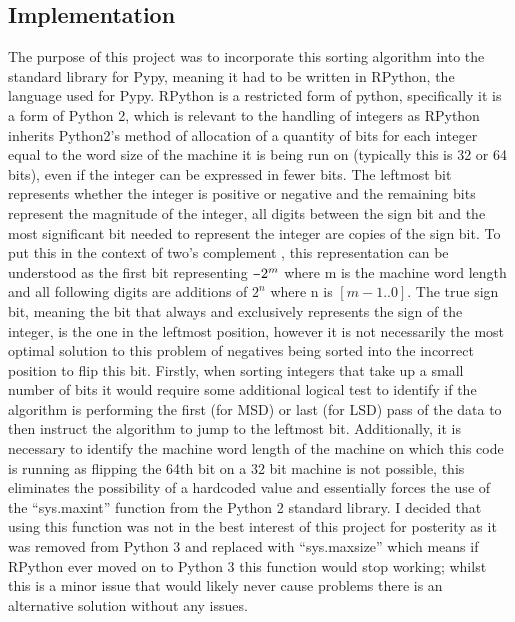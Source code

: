 \documentclass[12pt]{article}
\newcommand{\minus}{\scalebox{0.75}[1.0]{$-$}}
\begin{document}
	\subsection{Implementation}
	The purpose of this project was to incorporate this sorting algorithm into the standard library for Pypy, meaning it had to be written in RPython, the language used for Pypy. RPython is a restricted form of python, specifically it is a form of Python 2, which is relevant to the handling of integers as RPython inherits Python2’s method of allocation of a quantity of bits for each integer equal to the word size of the machine it is being run on (typically this is 32 or 64 bits), even if the integer can be expressed in fewer bits. The leftmost bit represents whether the integer is positive or negative and the remaining bits represent the magnitude of the integer, all digits between the sign bit and the most significant bit needed to represent the integer are copies of the sign bit. To put this in the context of two’s complement , this representation can be understood as the first bit representing $\minus2^{m}$ where m is the machine word length and all following digits are additions of $2^{n}$ where n is $[m-1..0]$.
	\newline
	\newline
	The true sign bit, meaning the bit that always and exclusively represents the sign of the integer, is the one in the leftmost position, however it is not necessarily the most optimal solution to this problem of negatives being sorted into the incorrect position to flip this bit. Firstly, when sorting integers that take up a small number of bits it would require some additional logical test to identify if the algorithm is performing the first (for MSD) or last (for LSD) pass of the data to then instruct the algorithm to jump to the leftmost bit. Additionally, it is necessary to identify the machine word length of the machine on which this code is running as flipping the 64th bit on a 32 bit machine is not possible, this eliminates the possibility of a hardcoded value and essentially forces the use of the “sys.maxint” function from the Python 2 standard library. I decided that using this function was not in the best interest of this project for posterity as it was removed from Python 3 and replaced with “sys.maxsize” which means if RPython ever moved on to Python 3 this function would stop working; whilst this is a minor issue that would likely never cause problems there is an alternative solution without any issues.
	\newline
\end{document}
